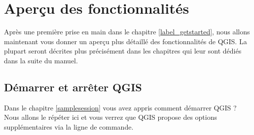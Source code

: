 
\section{Aperçu des fonctionnalités}\label{feature_glance}



Après une première prise en main dans le chapitre \ref{label_getstarted}, nous allons maintenant vous donner un aperçu plus détaillé des fonctionnalités de QGIS. La plupart seront décrites plus précisément dans les chapitres qui leur sont dédiés dans la suite du manuel.

%

\subsection{Démarrer et arrêter QGIS}\label{label_startinqgis}

Dans le chapitre \ref{samplesession} vous avez appris comment démarrer QGIS ? Nous allons le répéter ici et vous verrez que QGIS propose des options supplémentaires via la ligne de commande.


